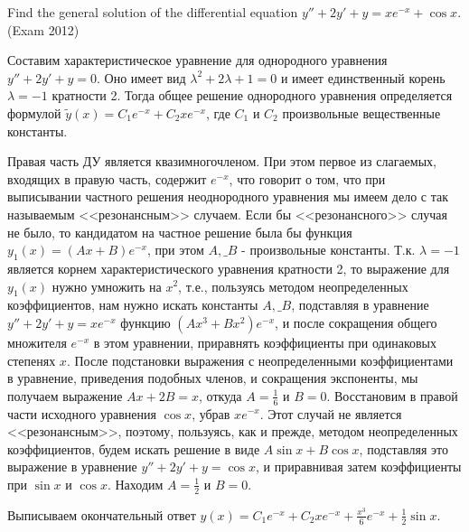 


\begin{problem}
Find the general solution of the differential equation $y''+2y'+y=xe^{-x} +\cos x$. (Exam 2012)
\end{problem}

\begin{solution}
Составим характеристическое уравнение для однородного уравнения $y''+2y'+y=0$. Оно имеет вид $\lambda ^{2} +2\lambda +1=0$ и имеет единственный корень $\lambda =-1$ кратности 2. Тогда общее решение однородного уравнения определяется формулой $\tilde{y}(x)=C_{1} e^{-x} +C_{2} xe^{-x} $, где $C_{1} $ и $C_{2} $ произвольные вещественные константы.

Правая часть ДУ является квазимногочленом. При этом первое из слагаемых, входящих в правую часть, содержит $e^{-x} $, что говорит о том, что при выписывании частного решения неоднородного уравнения мы имеем дело с так называемым <<резонансным>> случаем. Если бы <<резонансного>> случая не было, то кандидатом на частное решение была бы функция $y_{1} (x)=(Ax+B)e^{-x} $, при этом $A,\_ B$ - произвольные константы. Т.к. $\lambda =-1$ является корнем характеристического уравнения кратности 2, то выражение для $y_{1} (x)$ нужно умножить на $x^{2} $, т.е., пользуясь методом неопределенных коэффициентов, нам нужно искать константы $A,\_ B$, подставляя в уравнение $y''+2y'+y=xe^{-x} $ функцию $(Ax^{3} +Bx^{2} )e^{-x} $, и после сокращения общего множителя $e^{-x} $ в этом уравнении, приравнять коэффициенты при одинаковых степенях $x$. После подстановки выражения с неопределенными коэффициентами в уравнение, приведения подобных членов, и сокращения экспоненты, мы получаем выражение $Ax+2B=x$, откуда $A=\frac{1}{6} $ и $B=0$. Восстановим в правой части исходного уравнения $\cos x$, убрав $xe^{-x} $. Этот случай не является <<резонансным>>, поэтому, пользуясь, как и прежде, методом неопределенных коэффициентов, будем искать решение в виде $A\sin x+B\cos x$, подставляя это выражение в уравнение $y''+2y'+y=\cos x$, и приравнивая затем коэффициенты при $\sin x$ и $\cos x$. Находим $A=\frac{1}{2} $ и $B=0$.

Выписываем окончательный ответ $y(x)=C_{1} e^{-x} +C_{2} xe^{-x} +\frac{x^{3} }{6} e^{-x} +\frac{1}{2} \sin x$.
\end{solution}

